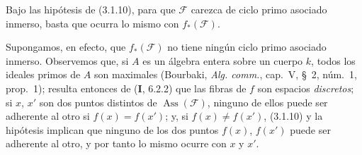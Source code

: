 \begin{corollary}[3.1.11]
\label{IV.2.3.1.11-fr}
Bajo las hipótesis de \textup{(3.1.10)}, para que $\mathcal F$ carezca de ciclo primo
asociado inmerso, basta que ocurra lo mismo con $f_*(\mathcal F)$.
\end{corollary}

Supongamos, en efecto, que $f_*(\mathcal F)$ no tiene ningún ciclo primo
asociado inmerso. Observemos que, si $A$ es un álgebra entera sobre un cuerpo
$k$, todos los ideales primos de $A$ son maximales (Bourbaki,
\emph{Alg. comm.}, cap.~V, \S~2, núm.~1, prop.~1); resulta entonces de
(\textbf I, 6.2.2) que las fibras de $f$ son espacios \emph{discretos}; si $x$, $x'$
son dos puntos distintos de $\operatorname{Ass}(\mathcal F)$, ninguno de ellos
puede ser adherente al otro si $f(x)=f(x')$; y, si $f(x)\ne f(x')$, (3.1.10)
y la hipótesis implican que ninguno de los dos puntos $f(x)$, $f(x')$ puede ser
adherente al otro, y por tanto lo mismo ocurre con $x$ y $x'$.

